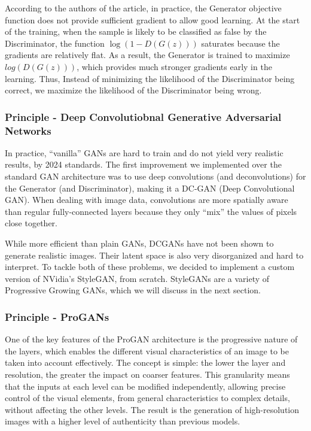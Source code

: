 \documentclass{article}
\begin{document}
According to the authors of the article, in practice, the Generator objective function does not provide sufficient gradient to allow good learning. At the start of the training, when the sample is likely to be classified as false by the Discriminator, the function $\log(1 - D(G(z)))$  saturates because the gradients are relatively flat. As a result, the Generator is trained to maximize $log(D(G(z)))$, which provides much stronger gradients early in the learning. Thus, Instead of minimizing the likelihood of the Discriminator being correct, we maximize the likelihood of the Discriminator being wrong. 

\subsubsection*{Principle - Deep Convolutiobnal Generative Adversarial Networks}
In practice, “vanilla” GANs are hard to train and do not yield very realistic results, by 2024 standards. The first improvement we implemented over the standard GAN architecture was to use deep convolutions (and deconvolutions) for the Generator (and Discriminator), making it a DC-GAN (Deep Convolutional GAN). When dealing with image data, convolutions are more spatially aware than regular fully-connected layers because they only “mix” the values of pixels close together.

While more efficient than plain GANs, DCGANs have not been shown to generate realistic images. Their latent space is also very disorganized and hard to interpret. To tackle both of these problems, we decided to implement a custom version of NVidia’s StyleGAN, from scratch. StyleGANs are a variety of Progressive Growing GANs, which we will discuss in the next section.

\subsubsection*{Principle - ProGANs}
One of the key features of the ProGAN architecture is the progressive nature of the layers, which enables the different visual characteristics of an image to be taken into account effectively. 
The concept is simple: the lower the layer and resolution, the greater the impact on coarser features. 
This granularity means that the inputs at each level can be modified independently, allowing precise control of the visual elements, from general characteristics to complex details, without affecting the other levels. 
The result is the generation of high-resolution images with a higher level of authenticity than previous models.
\end{document}
